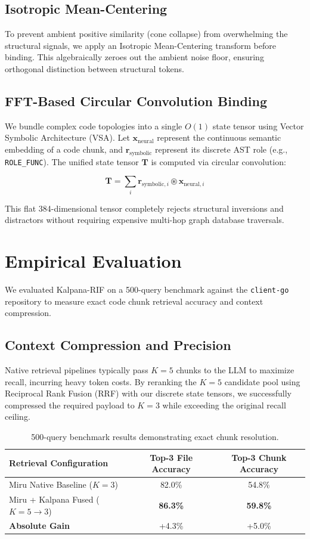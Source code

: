 \documentclass[11pt, a4paper]{article}
\begin{document}
\subsection{Isotropic Mean-Centering}
To prevent ambient positive similarity (cone collapse) from overwhelming the structural signals, we apply an Isotropic Mean-Centering transform before binding. This algebraically zeroes out the ambient noise floor, ensuring orthogonal distinction between structural tokens.

\subsection{FFT-Based Circular Convolution Binding}
We bundle complex code topologies into a single $O(1)$ state tensor using Vector Symbolic Architecture (VSA). Let $\mathbf{x}_{\text{neural}}$ represent the continuous semantic embedding of a code chunk, and $\mathbf{r}_{\text{symbolic}}$ represent its discrete AST role (e.g., \texttt{ROLE\_FUNC}). The unified state tensor $\mathbf{T}$ is computed via circular convolution:

\begin{equation}
    \mathbf{T} = \sum_{i} \mathbf{r}_{\text{symbolic}, i} \circledast \mathbf{x}_{\text{neural}, i}
\end{equation}

This flat 384-dimensional tensor completely rejects structural inversions and distractors without requiring expensive multi-hop graph database traversals.

\section{Empirical Evaluation}
We evaluated Kalpana-RIF on a 500-query benchmark against the \texttt{client-go} repository to measure exact code chunk retrieval accuracy and context compression.

\subsection{Context Compression and Precision}
Native retrieval pipelines typically pass $K=5$ chunks to the LLM to maximize recall, incurring heavy token costs. By reranking the $K=5$ candidate pool using Reciprocal Rank Fusion (RRF) with our discrete state tensors, we successfully compressed the required payload to $K=3$ while exceeding the original recall ceiling.

\begin{table}[h]
\centering
\begin{tabular}{@{}lcc@{}}
\toprule
\textbf{Retrieval Configuration} & \textbf{Top-3 File Accuracy} & \textbf{Top-3 Chunk Accuracy} \\ \midrule
Miru Native Baseline ($K=3$) & 82.0\% & 54.8\% \\
Miru + Kalpana Fused ($K=5 \to 3$) & \textbf{86.3\%} & \textbf{59.8\%} \\ \midrule
\textbf{Absolute Gain} & +4.3\% & +5.0\% \\ \bottomrule
\end{tabular}
\caption{500-query benchmark results demonstrating exact chunk resolution.}
\end{table}
\end{document}
